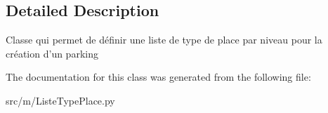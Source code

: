 \subsection{Detailed Description}
\begin{DoxyVerb}    Classe qui permet de définir une liste de type de place par niveau pour la création d'un parking
\end{DoxyVerb}
 

The documentation for this class was generated from the following file\+:\begin{DoxyCompactItemize}
\item 
src/m/Liste\+Type\+Place.\+py\end{DoxyCompactItemize}
